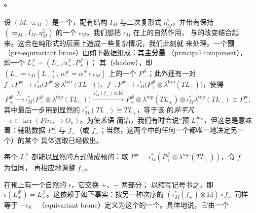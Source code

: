 \paragraph{\trEquivariant\trBrane。}\label{sub:equivariant-branes}
设 $(M,\varpi_M)$ 是一个\trSymplectic\trManifold，配有\trAlmostComplex{}结构
$I_M$ 与二次复\trVolume{}形式 $\eta_M^2$，并带有保持 $(\varpi_M,I_M,\eta_M^2)$ 的一个%
\trInvolution{} $\iota_M$。我们想把 $\iota_M$ 在\trLagrange\trSubmanifold{}上的自然作用，
与\trPinStructure{}的改变结合起来。这会在纯形式的层面上造成一些复杂情况，我们此刻就
来处理。一个\textbf{预\trEquivariant{}\trBrane}（pre-equivariant brane）由如下数据组成：其\textbf{主分量}%
（principal component），即一个\trLagrange\trBrane{} $L^{\#}_+=(L_+,\alpha^{\#}_+,P^{\#}_+)$；
其\textbf{\trShadow}（shadow），即\trGrading{}\trLagrange\trSubmanifold{}
$(L_-=\iota_M(L_+),\,\alpha^{\#}_-=\alpha^{\#}_+\circ\iota_M)$ 上的一个\trPinStructure{}
$P^{\#}_-$；此外还有一对\trIsomorphism{} $f_+\colon P^{\#}_+\to\iota_M^*\bigl(P^{\#}_-
\otimes\lambda^{\mathrm{top}}(TL_-)\bigr)$、$f_-\colon P^{\#}_-\to\iota_M^*\bigl(P^{\#}_+
\otimes\lambda^{\mathrm{top}}(TL_+)\bigr)$，使得\trComposition{}
\begin{equation}\label{eq:equivariant-shadow-composition}
P^{\#}_+\xrightarrow{\ f_+\ }\iota_M^*\bigl(P^{\#}_-\otimes\lambda^{\mathrm{top}}(TL_-)\bigr)
\xrightarrow{\ \iota_M^*(f_-)\otimes\mathrm{Id}\ }
P^{\#}_+\otimes\lambda^{\mathrm{top}}(TL_+)\otimes\iota_M^*\lambda^{\mathrm{top}}(TL_-)
\cong P^{\#}_+,
\end{equation}
其中最后一步用到显然的\trIsomorphism{} $\iota_M^*(TL_-)\cong TL_+$，等于该%
\trPinStructure{}的\emph{非平凡}\trAutomorphism{} $-e\in\ker(Pin_n\to O_n)$。为使术语
简洁，我们有时会说“预\trEquivariant{}\trBrane{} $L^{\#}_+$”，但这总是意味着：辅助数据 $P^{\#}_-$
与 $f_-$（或 $f_+$；当然，这两个\trIsomorphism{}中的任何一个都唯一地决定另一个）的某个
具体选取已经做出。
\begin{remark}\label{thm:equivariant-brane-remark}
每个\trLagrange\trBrane{} $L^{\#}_+$ 都能以显然的方式做成预\trEquivariant{}的：取
$P^{\#}_-=\iota_M^*(P^{\#}_+\otimes\lambda^{\mathrm{top}}(TL_+))$，令 $f_-$ 为恒同，
再相应地调整 $f_+$。
\end{remark}
在预\trEquivariant{}\trBrane{}上有一个自然的\trInvolution{} $\epsilon$，它交换 $+$、$-$ 两部分；
以缩写记号书之，即 $\epsilon(L^{\#}_+)=L^{\#}_-$。这依赖于如下事实：按另一种次序的\trComposition{}
$(\iota_M^*(f_+)\otimes\mathrm{Id})\circ f_-$ 同样等于 $-e$。\textbf{\trEquivariant{}\trBrane}%
（equivariant brane）定义为这个\trInvolution{}的一个\trFixedPoint。具体地说，它由一个
